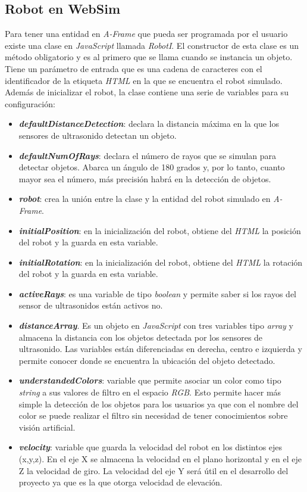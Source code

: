 \subsection{Robot en WebSim}
\label{subsec:robot}
Para tener una entidad en \textit{A-Frame} que pueda ser programada por el usuario existe una clase en \textit{JavaScript} llamada \textit{RobotI}.
El constructor de esta clase es un método obligatorio y es al primero que se llama cuando se instancia un objeto. 
Tiene un parámetro de entrada que es una cadena de caracteres con el identificador de la etiqueta \textit{HTML} en la que se encuentra el robot simulado. 
Además de inicializar el robot, la clase contiene una serie de variables para su configuración: 
\begin{itemize}
    \item \textit{\textbf{defaultDistanceDetection}}: declara la distancia máxima en la que los sensores de ultrasonido detectan un objeto.
    \item \textit{\textbf{defaultNumOfRays}}: declara el número de rayos que se simulan para detectar objetos. Abarca un ángulo de 180 grados y, por lo tanto, cuanto mayor sea el número, más precisión habrá en la detección de objetos. 
    \item \textit{\textbf{robot}}: crea la unión entre la clase y la entidad del robot simulado en \textit{A-Frame}.
    \item \textit{\textbf{initialPosition}}: en la inicialización del robot, obtiene del \textit{HTML} la posición del robot y la guarda en esta variable.  
    \item \textit{\textbf{initialRotation}}: en la inicialización del robot, obtiene del \textit{HTML} la rotación del robot y la guarda en esta variable.  
    \item \textit{\textbf{activeRays}}: es una variable de tipo \textit{boolean} y permite saber si los rayos del sensor de ultrasonidos están activos no.
    \item \textit{\textbf{distanceArray}}. Es un objeto en \textit{JavaScript} con tres variables tipo \textit{array} y almacena la distancia con los objetos detectada por los sensores de ultrasonido. Las variables están diferenciadas en derecha, centro e izquierda y permite conocer donde se encuentra la ubicación del objeto detectado. 
    \item \textit{\textbf{understandedColors}}: variable que permite asociar un color como tipo \textit{string} a sus valores de filtro en el espacio \textit{RGB}. Esto permite hacer más simple la detección de los objetos para los usuarios ya que con el nombre del color se puede realizar el filtro sin necesidad de tener conocimientos sobre visión artificial.
    \item \textit{\textbf{velocity}}: variable que guarda la velocidad del robot en los distintos ejes (x,y,z). En el eje X se almacena la velocidad en el plano horizontal y en el eje Z la velocidad de giro. La velocidad del eje Y será útil en el desarrollo del proyecto ya que es la que otorga velocidad de elevación. 
\end{itemize}

